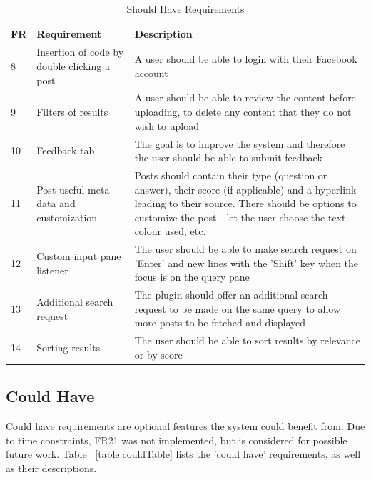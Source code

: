 \documentclass{l4proj}
\begin{document}
\begin{table}[h]
\caption{Should Have Requirements}
\centering
\def\arraystretch{1.5}
\begin{tabular}{p{2cm}p{4cm}p{9cm}}
\hline
FR & Requirement & Description \\
\hline
8 & Insertion of code by double clicking a post & A user should be able to login with their Facebook account \\
9 & Filters of results & A user should be able to review the content before uploading, to delete any content that they do not wish to upload \\
10 & Feedback tab & The goal is to improve the system and therefore the user should be able to submit feedback \\
11 & Post useful meta data and customization & Posts should contain their type (question or answer), their score (if applicable) and a hyperlink leading to their source. There should be options to customize the post - let the user choose the text colour used, etc.\\
12 & Custom input pane listener & The user should be able to make search request on 'Enter' and new lines with the 'Shift' key when the focus is on the query pane\\
13 & Additional search request & The plugin should offer an additional search request to be made on the same query to allow more posts to be fetched and displayed\\
14 & Sorting results & The user should be able to sort results by relevance or by score\\
\end{tabular}
\label{table:shouldTable}
\end{table}

\subsection{Could Have}
Could have requirements are optional features the system could benefit from. Due to time constraints, FR21 was not implemented, but is considered for possible future work. Table ~\ref{table:couldTable}  lists the 'could have' requirements, as well as their descriptions.
\end{document}
